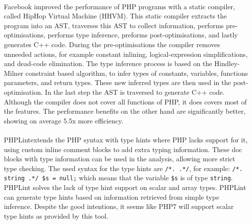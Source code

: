 \documentclass[../main.tex]{subfiles}
\begin{document}
    \paragraph{}
    Facebook improved the performance of PHP programs with a static compiler, called HipHop Virtual Machine\cite{Zha:12} (HHVM).
    This static compiler extracts the program into an AST, traverses this AST to collect information, performs pre-optimisations, performs type inference, preforms post-optimisations, and lastly generates C++ code.
    During the pre-optimisations the compiler removes unneeded actions, for example constant inlining, logical-expression simplifications, and dead-code elimination.
    The type inference process is based on the Hindley-Milner constraint based algorithm\cite{Dam:82}, to infer types of constants, variables, functions parameters, and return types.
    These new inferred types are then used in the post-optimisation.
    In the last step the AST is traversed to generate C++ code.
    Although the compiler does not cover all functions of PHP, it does covers most of the features.
    The performance benefits on the other hand are significantly better, showing on average 5.5x more efficiency.
        
    \paragraph{}
    PHPLint\footnotemark extends the PHP syntax with type hints where PHP lacks support for it, using custom inline comment blocks to add extra typing information.
    These doc blocks with type information can be used in the analysis, allowing more strict type checking.
    The used syntax for the type hints are \texttt{/*. .*/}, for example: \texttt{/*. string .*/ \$s = null;} which means that the variable \texttt{\$s} is of type \texttt{string}.
    PHPLint solves the lack of type hint support on scalar and array types.
    PHPLint can generate type hints based on information retrieved from simple type inference.
    Despite the good intentions, it seems like PHP7 will support scalar type hints as provided by this tool.
\end{document}
